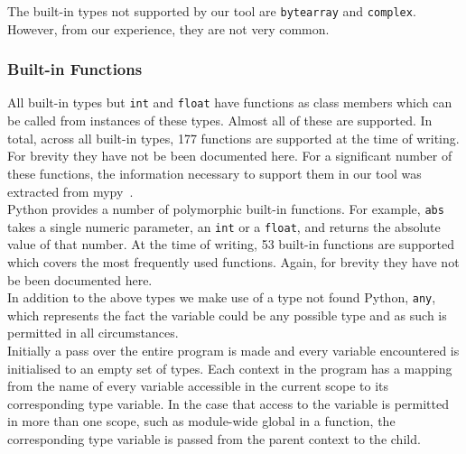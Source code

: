 \documentclass[12pt, titlepage]{article}
\begin{document}
The built-in types not supported by our tool are \texttt{bytearray} and \texttt{complex}. However, from our experience, they are not very common.

\subsubsection{Built-in Functions}
\indent All built-in types but \texttt{int} and \texttt{float} have functions as class members which can be called from instances of these types. Almost all of these are supported. In total, across all built-in types, 177 functions are supported at the time of writing. For brevity they have not be been documented here. For a significant number of these functions, the information necessary to support them in our tool was extracted from mypy~\cite{mypy}. \\
\indent Python provides a number of polymorphic built-in functions. For example, \texttt{abs} takes a single numeric parameter, an \texttt{int} or a \texttt{float}, and returns the absolute value of that number. At the time of writing, 53 built-in functions are supported which covers the most frequently used functions. Again, for brevity they have not be been documented here. \\
\indent In addition to the above types we make use of a type not found Python, \texttt{any}, which represents the fact the variable could be any possible type and as such is permitted in all circumstances. \\
\indent Initially a pass over the entire program is made and every variable encountered is initialised to an empty set of types. Each context in the program has a mapping from the name of every variable accessible in the current scope to its corresponding type variable. In the case that access to the variable is permitted in more than one scope, such as module-wide global in a function, the corresponding type variable is passed from the parent context to the child.
\end{document}

